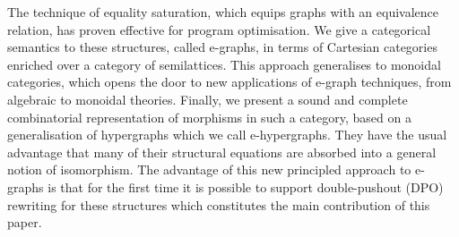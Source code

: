 The technique of equality saturation, which equips graphs with an equivalence relation, has proven effective for program optimisation.
We give a categorical semantics to these structures, called e-graphs, in terms of Cartesian categories enriched over a category of semilattices.
This approach generalises to monoidal categories, which opens the door to new applications of e-graph techniques, from algebraic to monoidal theories.
Finally, we present a sound and complete combinatorial representation of morphisms in such a category,  based on a generalisation of hypergraphs which we call e-hypergraphs.
They have the usual advantage that many of their structural equations are absorbed into a general notion of isomorphism. 
The advantage of this new principled approach to e-graphs is that for the first time it is possible to support double-pushout (DPO) rewriting for these structures which constitutes the main contribution of this paper.